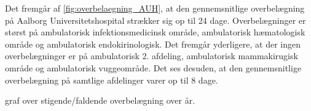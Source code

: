 \noindent
Det fremgår af \autoref{fig:overbelaegning_AUH}, at den gennemsnitlige overbelægning på Aalborg Universitetshospital strækker sig op til 24 dage.  Overbelægninger er størst på ambulatorisk infektionsmedicinsk område, ambulatorisk hæmatologisk område og ambulatorisk endokirinologisk. Det fremgår yderligere, at der ingen overbelægninger er på ambulatorisk 2. afdeling, ambulatorisk mammakirugisk  område og ambulatorisk vuggeområde. Det ses desuden, at den gennemsnitlige overbelægning på samtlige afdelinger varer op til 8 dage. 

graf over stigende/faldende overbelægning over år. 




